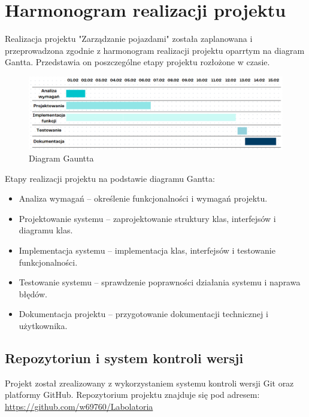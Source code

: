﻿%
\chapter{Harmonogram realizacji projektu}
Realizacja projektu "Zarządzanie pojazdami" została zaplanowana i przeprowadzona zgodnie z harmonogram realizacji projektu oparrtym na diagram Gantta. Przedstawia on poszczególne etapy projektu rozłożone w czasie.


\begin{figure}[h] 
    \centering
    \includegraphics[width=1\textwidth]{Daigram gaunt.png}
    \caption{Diagram Gauntta}
    \label{fig:moj_obrazek}
\end{figure}
Etapy realizacji projektu na podstawie diagramu Gantta:
\begin{itemize}
    \item Analiza wymagań – określenie funkcjonalności i wymagań projektu.
    \item Projektowanie systemu – zaprojektowanie struktury klas, interfejsów i diagramu klas.
    \item Implementacja systemu – implementacja klas, interfejsów i testowanie funkcjonalności.
    \item Testowanie systemu – sprawdzenie poprawności działania systemu i naprawa błędów.
    \item Dokumentacja projektu – przygotowanie dokumentacji technicznej i użytkownika.
\end{itemize}
\section*{Repozytoriun i system kontroli wersji}
Projekt został zrealizowany z wykorzystaniem systemu kontroli wersji Git oraz platformy GitHub. Repozytorium projektu znajduje się pod adresem: \url{https://github.com/w69760/Labolatoria}
